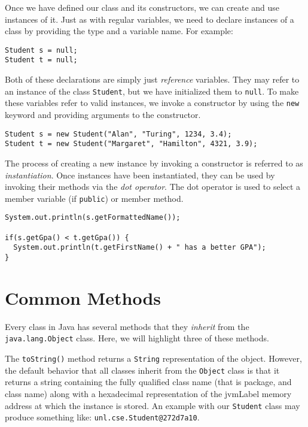Once we have defined our class and its constructors, we can 
create and use instances of it.  Just as with regular variables, 
we need to declare instances of a class by providing the type
and a variable name.  For example:

\begin{verbatim}
Student s = null;
Student t = null;
\end{verbatim}

Both of these declarations are simply just \emph{reference} variables.
They may refer to an instance of the class \texttt{Student}, but
we have initialized them to \texttt{null}.  To make
these variables refer to valid instances, we invoke a constructor
by using the \texttt{new} keyword and providing arguments
to the constructor.

\begin{verbatim}
Student s = new Student("Alan", "Turing", 1234, 3.4);
Student t = new Student("Margaret", "Hamilton", 4321, 3.9);
\end{verbatim}

The process of creating a new instance by invoking a constructor is
referred to as \emph{instantiation}.  Once instances have been instantiated,
they can be used by invoking their methods via the \emph{dot operator}.
The dot operator is used to select a member variable (if 
\texttt{public}) or member method.

\begin{verbatim}
System.out.println(s.getFormattedName());

if(s.getGpa() < t.getGpa()) {
  System.out.println(t.getFirstName() + " has a better GPA");
}
\end{verbatim}

\section{Common Methods}

Every class in Java has several methods that they \emph{inherit} 
from the \texttt{java.lang.Object} class.  Here, we will 
highlight three of these methods.

The \texttt{toString()} method returns a \texttt{String}
representation of the object.  However, the default behavior that all
classes inherit from the \texttt{Object} class is that it
returns a string containing the fully qualified class name 
(that is package, and class name) along with a \gls{hexadecimal}
representation of the \gls{jvmLabel} memory address at which the
instance is stored.  An example with our \texttt{Student}
class may produce something like: \texttt{unl.cse.Student@272d7a10}.

